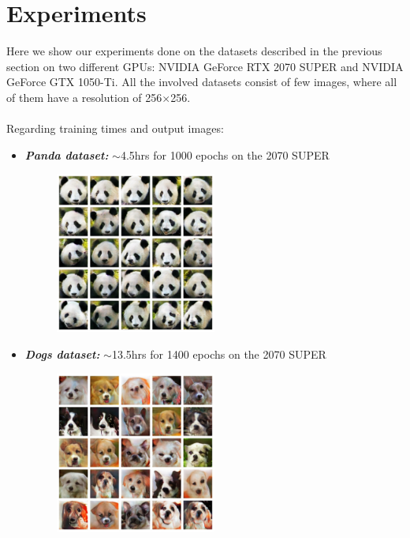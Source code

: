 \documentclass[12pt]{article}
\begin{document}

\section{Experiments}
\large
Here we show our experiments done on the datasets described in the previous section on two different
GPUs: NVIDIA GeForce RTX 2070 SUPER and NVIDIA GeForce GTX 1050-Ti. All the involved datasets consist 
of few images, where all of them have a resolution of 256$\times$256.\\\\
Regarding training times and output images:
\begin{itemize}
	\item {			 
		\textbf{\textit{Panda dataset:}} $\sim$4.5hrs for 1000 epochs on the 2070 SUPER
		\begin{figure}[H]
			\centering
			\includegraphics[width=0.5\textwidth]{Images/panda_exp.jpg}
		\end{figure}
	}
	\item {
		\textbf{\textit{Dogs dataset:}} $\sim$13.5hrs for 1400 epochs on the 2070 SUPER
		\begin{figure}[H]
			\centering
			\includegraphics[width=0.5\textwidth]{Images/dogs_exp.jpg}

\end{figure}}
\end{itemize}
\end{document}
